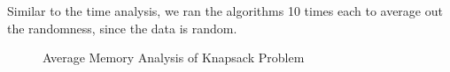 \documentclass[a4paper, 11pt]{article}
\begin{document}
Similar to the time analysis, we ran the algorithms 10 times each to average out the randomness, since the data is random.

\begin{figure}[!ht] 
  \caption{Average Memory Analysis of Knapsack Problem} 
  \centering
  \label{fig:AvgMemAnalysis}
\end{figure}
\end{document}

